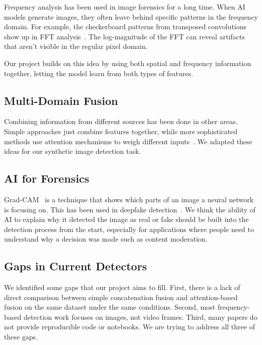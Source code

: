 \documentclass{article}
\begin{document}
Frequency analysis has been used in image forensics for a long time. When AI models generate images, they often leave behind specific patterns in the frequency domain. For example, the checkerboard patterns from transposed convolutions show up in FFT analysis~\cite{zhang2023frequency, durali2020frequency}. The log-magnitude of the FFT can reveal artifacts that aren't visible in the regular pixel domain.

Our project builds on this idea by using both spatial and frequency information together, letting the model learn from both types of features.

\subsection{Multi-Domain Fusion}

Combining information from different sources has been done in other areas. Simple approaches just combine features together, while more sophisticated methods use attention mechanisms to weigh different inputs~\cite{guera2018deepfake, vaswani2017attention}. We adapted these ideas for our synthetic image detection task.

\subsection{AI for Forensics}

Grad-CAM~\cite{selvaraju2017grad} is a technique that shows which parts of an image a neural network is focusing on. This has been used in deepfake detection~\cite{chihaoui2022gradcam}. We think the ability of AI to explain why it detected the image as real or fake should be built into the detection process from the start, especially for applications where people need to understand why a decision was made such as content moderation.

\subsection{Gaps in Current Detectors}

We identified some gaps that our project aims to fill. First, there is a lack of direct comparison between simple concatenation fusion and attention-based fusion on the same dataset under the same conditions. Second, most frequency-based detection work focuses on images, not video frames. Third, many papers do not provide reproducible code or notebooks. We are trying to address all three of these gaps.
\end{document}
